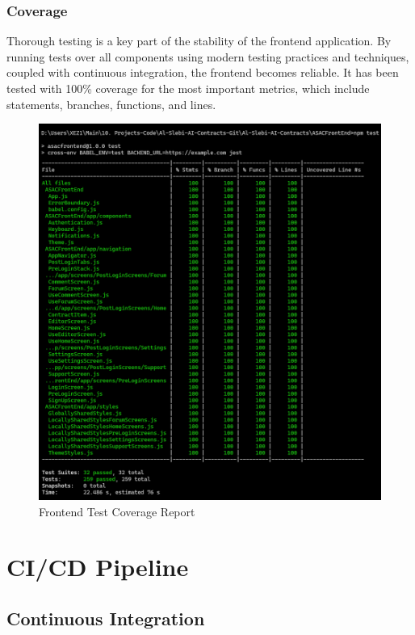 \subsubsection{Coverage}

Thorough testing is a key part of the stability of the frontend application. By running tests over all components using modern testing practices and techniques, coupled with continuous integration, the frontend becomes reliable. It has been tested with 100\% coverage for the most important metrics, which include statements, branches, functions, and lines.

\begin{figure}[!ht]
    \centering
    \includegraphics[width=1\textwidth]{LATEX/Appendices/Images/Software/Frontend/frontend_testing_report.png}
    \caption{Frontend Test Coverage Report}
    \label{fig:frontend_testing}
\end{figure}

\section{CI/CD Pipeline}

\subsection{Continuous Integration}

